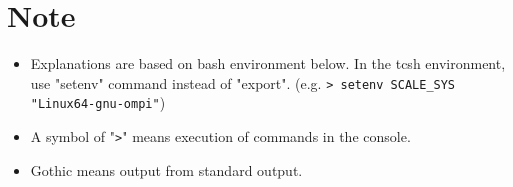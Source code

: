 \section{Note}
 \begin{itemize}
   \item Explanations are based on bash environment below.
         In the tcsh environment, use "setenv" command instead of "export".
         (e.g. \verb|> setenv SCALE_SYS "Linux64-gnu-ompi"|)
   \item A symbol of "\verb|>|" means execution of commands in the console.
   \item Gothic means output from standard output.
 \end{itemize}

